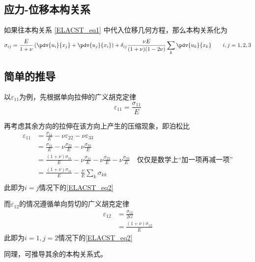 \subsection{应力-位移本构关系}
如果往本构关系 \autoref{ELACST_eq1} 中代入位移几何方程，那么本构关系化为
\begin{equation}
\sigma_{ij}=\frac{E}{1+\nu}\left(\pdv{u_i}{x_j}+\pdv{u_j}{x_i}\right)
+\delta_{ij}\frac{\nu E}{(1+\nu)(1-2\nu)}\sum_k\pdv{u_k}{x_k}\qquad i,j=1,2,3
\end{equation}

\subsection{简单的推导}
以$\varepsilon_{11}$为例，先根据单向拉伸的广义胡克定律
$$\varepsilon_{11} = \frac{\sigma_{11}}{E}$$

再考虑其余方向的拉伸在该方向上产生的压缩现象，即泊松比
$$
\begin{aligned}
\varepsilon_{11} &= \frac{\sigma_{11}}{E} - \nu \varepsilon_{22}  - \nu \varepsilon_{33}\\
&=\frac{\sigma_{11}}{E} - \nu\frac{\sigma_{22}}{E} - \nu\frac{\sigma_{33}}{E}\\
&=\frac{(1+\nu)\sigma_{11}}{E} - \nu\frac{\sigma_{11}}{E}  - \nu\frac{\sigma_{22}}{E} - \nu\frac{\sigma_{33}}{E} \quad \text{仅仅是数学上“加一项再减一项”}\\
&=\frac{(1+\nu)\sigma_{11}}{E} - \frac{\nu}{E}\sum_k \sigma_{kk} \\
\end{aligned}
$$
此即为$i=j$情况下的\autoref{ELACST_eq2} 

而$\varepsilon_{12}$的情况遵循单向剪切的广义胡克定律
$$
\begin{aligned}
\varepsilon_{12} &= \frac{\sigma_{12}}{2G}\\
&=\frac{(1+\nu)\sigma_{12}}{E}
\end{aligned}
$$
此即为$i=1, j=2$情况下的\autoref{ELACST_eq2} 

同理，可推导其余的本构关系式。
